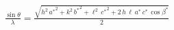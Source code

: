


\begin{eqnarray*}
  \frac{\sin \theta}{\lambda} = \frac{\sqrt{h^2\,{a^\ast}^2+k^2\,{b^\ast}^2+\ell^2\,{c^\ast}^2 + 2\,h\,\ell\,a^\ast\,c^\ast\,\cos \beta^\ast}}{2}
\end{eqnarray*}

